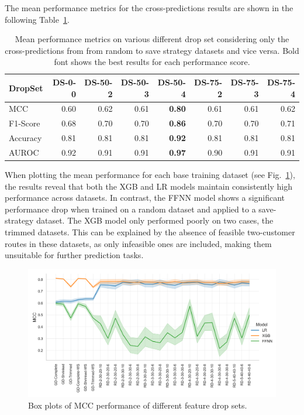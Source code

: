 The mean performance metrics for the cross-predictions results are shown in the following Table~\ref{tab:featurePerformance_OnlyCrossCorrelation}.
\begin{table}[ht]
	\centering
	\small
	\begin{tabular}{lrrrrrrr}
		\toprule
		DropSet  & DS-0-0 & DS-50-2 & DS-50-3 & DS-50-4       & DS-75-2 & DS-75-3 & DS-75-4 \\
		\midrule
		MCC      & 0.60   & 0.62    & 0.61    & \textbf{0.80} & 0.61    & 0.61    & 0.62    \\
		F1-Score & 0.68   & 0.70    & 0.70    & \textbf{0.86} & 0.70    & 0.70    & 0.71    \\
		Accuracy & 0.81   & 0.81    & 0.81    & \textbf{0.92} & 0.81    & 0.81    & 0.81    \\
		AUROC    & 0.92   & 0.91    & 0.91    & \textbf{0.97} & 0.90    & 0.91    & 0.91    \\
		\bottomrule
	\end{tabular}
	\caption[Mean performance metrics on various different drop set considering only the cross-predictions from random to save strategy datasets and vice versa.]
	{Mean performance metrics on various different drop set considering only the cross-predictions from from random to save strategy datasets and vice versa.
		Bold font shows the best results for each performance score.}
	\label{tab:featurePerformance_OnlyCrossCorrelation}
\end{table}
When plotting the mean performance for each base training dataset (see Fig.~\ref{fig:mcc_filter_results_lineplot}),
the results reveal that both the XGB and LR models maintain consistently high performance across datasets. In contrast,
the FFNN model shows a significant performance drop when trained on a random dataset and applied to a save-strategy dataset.
The XGB model only performed poorly on two cases, the trimmed datasets. This can be explained by the absence of feasible
two-customer routes in these datasets, as only infeasible ones are included, making them unsuitable for further prediction tasks.
\begin{figure}[ht]
	\centering
	\includegraphics[width = .95\textwidth]{pictures/feature_filter/cross_performance_lineplot.png}
	\caption{Box plots of MCC performance of different feature drop sets.}
	\label{fig:mcc_filter_results_lineplot}
\end{figure}%
